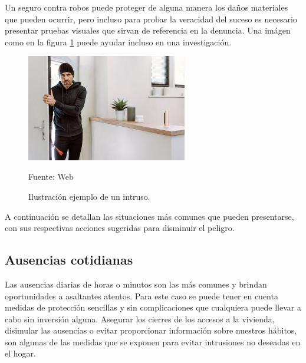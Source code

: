 Un seguro contra robos puede proteger de alguna manera los daños materiales que pueden ocurrir, pero incluso para probar la veracidad del suceso es necesario presentar pruebas visuales que sirvan de referencia en la denuncia. Una imágen como en la figura \ref{fig:intruso} puede ayudar incluso en una investigación.\\

\begin{figure}[H]
    \begin{center}
        \includegraphics[width=7cm]{img/capitulo_3/intruso.jpg}
    \end{center}
    \begin{center}
        \caption{Ilustración ejemplo de un intruso.}
        Fuente: Web
        \label{fig:intruso}
    \end{center}
\end{figure}

A continuación se detallan las situaciones más comunes que pueden presentarse, con sus respectivas acciones sugeridas para disminuir el peligro.\\

\subsection{Ausencias cotidianas}
Las ausencias diarias de horas o minutos son las más comunes y brindan oportunidades a asaltantes atentos. Para este caso se puede tener en cuenta medidas de protección sencillas y sin complicaciones que cualquiera puede llevar a cabo sin inversión alguna. Asegurar los cierres de los accesos a la vivienda, disimular las ausencias o evitar proporcionar información sobre nuestros hábitos, son algunas de las medidas que se exponen para evitar intrusiones no deseadas en el hogar.\\
 

